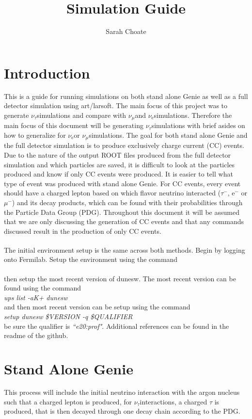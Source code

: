 \documentclass{article}
\title{Simulation Guide}
\author{Sarah Choate}
\date{}
\newcommand{\nutau}{$\nu_{\tau}$\space}
\newcommand{\nue}{$\nu_{\text{e}}$\space}
\newcommand{\numu}{$\nu_{\mu}$\space}
\begin{document}
\maketitle

\section{Introduction}
This is a guide for running simulations on both stand alone Genie as well as a full detector simulation using art/larsoft. The main focus of this project was to generate \nutau simulations and compare with \numu and \nue simulations. Therefore the main focus of this document will be generating \nutau simulations with brief asides on how to generalize for \nue or \numu simulations. The goal for both stand alone Genie and the full detector simulation is to produce exclusively charge current (CC) events. Due to the nature of the output ROOT files produced from the full detector simulation and which particles are saved, it is difficult to look at the particles produced and know if only CC events were produced. It is easier to tell what type of event was produced with stand alone Genie. For CC events, every event should have a charged lepton based on which flavor neutrino interacted ($\tau^-$, e$^-$ or $\mu^-$) and its decay products, which can be found with their probabilities through the Particle Data Group (PDG). Throughout this document it will be assumed that we are only discussing the generation of CC events and that any commands discussed result in the production of only CC events. 
\\ \\
The initial environment setup is the same across both methods. Begin by logging onto Fermilab. Setup the environment using the command \\ 
 \\ 
then setup the most recent version of dunesw. The most recent version can be found using the command  \\
\textit{ups list -aK+ dunesw} \\ 
and then most recent version can be setup using the command \\ 
\textit{setup dunesw \$VERSION -q \$QUALIFIER} \\ 
be sure the qualifier is \textit{``e20:prof"}. Additional references can be found in the readme of the github. 

\section{Stand Alone Genie}
This process will include the initial neutrino interaction with the argon nucleus such that a charged lepton is produced, for \nutau interactions, a charged $\tau$ is produced, that is then decayed through one decay chain according to the PDG. 
\end{document}
